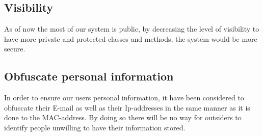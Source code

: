 \subsection*{Visibility}
As of now the most of our system is public, by decreasing the level of visibility to have more private and protected classes and methods, the system would be more secure.
 
\subsection*{Obfuscate personal information}
In order to ensure our users personal information, it have been considered to obfuscate their E-mail as well as their Ip-addresses in the same manner as it is done to the MAC-address. By doing so there will be no way for outsiders to identify people unwilling to have their information stored.
